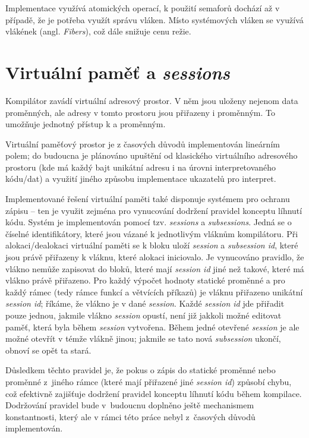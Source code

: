 Implementace využívá atomických operací, k použití semaforů dochází až v případě, že je potřeba využít správu vláken. Místo systémových vláken se využívá vlákének (angl. \textit{Fibers}), což dále snižuje cenu režie.

\section{Virtuální paměť a \textit{sessions}} \label{sec:sessions}
Kompilátor zavádí virtuální adresový prostor. V něm jsou uloženy nejenom data \ctime proměnných, ale  adresy v tomto prostoru jsou přiřazeny i \nonctime proměnným. To umožňuje jednotný přístup k \ctime a \nonctime proměnným.

Virtuální paměťový prostor je z časových důvodů implementován lineárním polem; do budoucna je plánováno upuštění od klasického virtuálního adresového prostoru (kde má každý bajt unikátní adresu i na úrovni interpretovaného kódu/dat) a využití jiného způsobu implementace ukazatelů pro interpret.

Implementované řešení virtuální paměti také disponuje systémem pro ochranu zápisu -- ten je využit zejména pro vynucování dodržení pravidel konceptu líhnutí kódu. Systém je implementován pomocí tzv. \textit{sessions} a \textit{subsessions}. Jedná se o číselné identifikátory, které jsou vázané k jednotlivým vláknům kompilátoru. Při alokaci/dealokaci virtuální paměti se k bloku uloží \textit{session} a \textit{subsession id}, které jsou právě přiřazeny k vláknu, které alokaci iniciovalo. Je vynucováno pravidlo, že vlákno nemůže zapisovat do bloků, které mají \textit{session id} jiné než takové, které má vlákno právě přiřazeno. Pro každý výpočet hodnoty statické proměnné a pro každý \nonctime rámec (tedy rámce \nonctime funkcí a větvících příkazů) je vláknu přiřazeno unikátní \textit{session id}; říkáme, že vlákno je v dané \textit{session}. Každé \textit{session id} jde přiřadit pouze jednou, jakmile vlákno \textit{session} opustí, není již jakkoli možné editovat paměť, která byla během \textit{session} vytvořena. Během jedné otevřené \textit{session} je ale možné otevřít v témže vlákně jinou; jakmile se tato nová \textit{subsession} ukončí, obnoví se opět ta stará.

Důsledkem těchto pravidel je, že pokus o zápis do statické proměnné nebo proměnné z~jiného rámce (které mají přiřazené jiné \textit{session id}) způsobí chybu, což efektivně zajišťuje dodržení pravidel konceptu líhnutí kódu během kompilace. Dodržování pravidel bude v~budoucnu doplněno ještě mechanismem konstantnosti, který ale v rámci této práce nebyl z~časových důvodů implementován.

